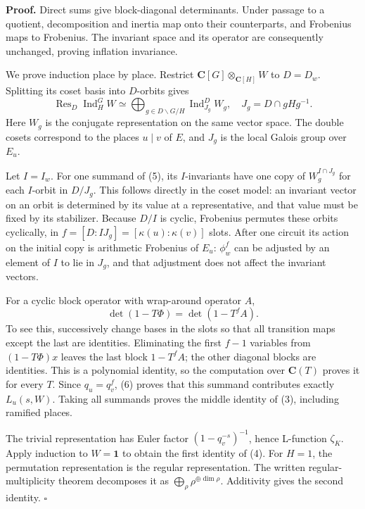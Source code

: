 \documentclass[11pt,a4paper]{article}
\begin{document}
\textbf{Proof.} Direct sums give block-diagonal determinants. Under
passage to a quotient, decomposition and inertia map onto their
counterparts, and Frobenius maps to Frobenius. The invariant space and
its operator are consequently unchanged, proving inflation invariance.

We prove induction place by place. Restrict
\(\mathbf C[G]\otimes_{\mathbf C[H]}W\) to \(D=D_w\). Splitting its
coset basis into \(D\)-orbits gives \[
\operatorname{Res}_D\operatorname{Ind}_H^G W
\simeq\bigoplus_{g\in D\backslash G/H}
\operatorname{Ind}_{J_g}^{D}W_g,
\quad J_g=D\cap gHg^{-1}.
\tag{5}
\] Here \(W_g\) is the conjugate representation on the same vector
space. The double cosets correspond to the places \(u\mid v\) of \(E\),
and \(J_g\) is the local Galois group over \(E_u\).

Let \(I=I_w\). For one summand of (5), its \(I\)-invariants have one
copy of \(W_g^{I\cap J_g}\) for each \(I\)-orbit in \(D/J_g\). This
follows directly in the coset model: an invariant vector on an orbit is
determined by its value at a representative, and that value must be
fixed by its stabilizer. Because \(D/I\) is cyclic, Frobenius permutes
these orbits cyclically, in \(f=[D:IJ_g]=[\kappa(u):\kappa(v)]\) slots.
After one circuit its action on the initial copy is arithmetic Frobenius
of \(E_u\): \(\phi_w^f\) can be adjusted by an element of \(I\) to lie
in \(J_g\), and that adjustment does not affect the invariant vectors.

For a cyclic block operator with wrap-around operator \(A\), \[
\det(1-T\Phi)=\det(1-T^f A).
\tag{6}
\] To see this, successively change bases in the slots so that all
transition maps except the last are identities. Eliminating the first
\(f-1\) variables from \((1-T\Phi)x\) leaves the last block \(1-T^f A\);
the other diagonal blocks are identities. This is a polynomial identity,
so the computation over \(\mathbf C(T)\) proves it for every \(T\).
Since \(q_u=q_v^f\), (6) proves that this summand contributes exactly
\(L_u(s,W)\). Taking all summands proves the middle identity of (3),
including ramified places.

The trivial representation has Euler factor \((1-q_v^{-s})^{-1}\), hence
L-function \(\zeta_K\). Apply induction to \(W=\mathbf1\) to obtain the
first identity of (4). For \(H=1\), the permutation representation is
the regular representation. The written regular-multiplicity theorem
decomposes it as \(\bigoplus_\rho\rho^{\oplus\dim\rho}\). Additivity
gives the second identity. \(\square\)
\end{document}
